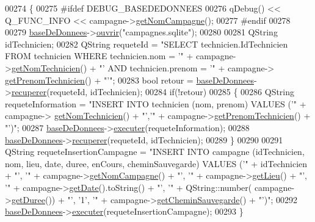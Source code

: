 \begin{DoxyCode}
00274 \{
00275 \textcolor{preprocessor}{    #ifdef DEBUG\_BASEDEDONNEES}
00276     qDebug() << Q\_FUNC\_INFO << campagne->\hyperlink{class_campagne_a99a682fcb8e5a3f8c2aff7a44eb2c930}{getNomCampagne}();
00277 \textcolor{preprocessor}{    #endif}
00278 
00279     \hyperlink{class_i_h_m_accueil_ab56d9846c071396a92f88272880e2c1f}{baseDeDonnees}->\hyperlink{class_base_de_donnees_a7f6a5510b08017b0d99115a84252f186}{ouvrir}(\textcolor{stringliteral}{"campagnes.sqlite"});
00280 
00281     QString idTechnicien;
00282     QString requeteId = \textcolor{stringliteral}{"SELECT technicien.IdTechnicien FROM technicien WHERE technicien.nom = '"} + 
      campagne->\hyperlink{class_campagne_ae1df1bd6234222ccdaf5a1d20d64ee46}{getNomTechnicien}() + \textcolor{stringliteral}{"' AND technicien.prenom = '"} + campagne->
      \hyperlink{class_campagne_ac6c7772ef5d7b15964664d659b486263}{getPrenomTechnicien}() + \textcolor{stringliteral}{"'"};
00283     \textcolor{keywordtype}{bool} retour = \hyperlink{class_i_h_m_accueil_ab56d9846c071396a92f88272880e2c1f}{baseDeDonnees}->\hyperlink{class_base_de_donnees_a77539baad389f5acf754cd2cd452403e}{recuperer}(requeteId, idTechnicien);
00284     \textcolor{keywordflow}{if}(!retour)
00285     \{
00286         QString requeteInformation = \textcolor{stringliteral}{"INSERT INTO technicien (nom, prenom) VALUES ('"} + campagne->
      \hyperlink{class_campagne_ae1df1bd6234222ccdaf5a1d20d64ee46}{getNomTechnicien}() + \textcolor{stringliteral}{"','"} + campagne->\hyperlink{class_campagne_ac6c7772ef5d7b15964664d659b486263}{getPrenomTechnicien}() + \textcolor{stringliteral}{"')"};
00287         \hyperlink{class_i_h_m_accueil_ab56d9846c071396a92f88272880e2c1f}{baseDeDonnees}->\hyperlink{class_base_de_donnees_aa8de5f8f8bb17edc43f5c0ee33712081}{executer}(requeteInformation);
00288         \hyperlink{class_i_h_m_accueil_ab56d9846c071396a92f88272880e2c1f}{baseDeDonnees}->\hyperlink{class_base_de_donnees_a77539baad389f5acf754cd2cd452403e}{recuperer}(requeteId, idTechnicien);
00289     \}
00290 
00291     QString requeteInsertionCampagne = \textcolor{stringliteral}{"INSERT INTO campagne (idTechnicien, nom, lieu, date, duree,
       enCours, cheminSauvegarde) VALUES ('"} + idTechnicien + \textcolor{stringliteral}{"', '"} + campagne->\hyperlink{class_campagne_a99a682fcb8e5a3f8c2aff7a44eb2c930}{getNomCampagne}() + \textcolor{stringliteral}{"', '"} +
       campagne->\hyperlink{class_campagne_a98d71a731d16dec7a882787387b29d8e}{getLieu}() + \textcolor{stringliteral}{"', '"} + campagne->\hyperlink{class_campagne_a319b5bb4ed2b0fc1a10fc4d099a7a6d2}{getDate}().toString() + \textcolor{stringliteral}{"', '"} + QString::number(
      campagne->\hyperlink{class_campagne_abe02a9050f4a5ea9521dd40b855c350b}{getDuree}()) + \textcolor{stringliteral}{"', '1', '"} + campagne->\hyperlink{class_campagne_ad752790357417d83a93056d9c9689a16}{getCheminSauvegarde}() + \textcolor{stringliteral}{"')"};
00292     \hyperlink{class_i_h_m_accueil_ab56d9846c071396a92f88272880e2c1f}{baseDeDonnees}->\hyperlink{class_base_de_donnees_aa8de5f8f8bb17edc43f5c0ee33712081}{executer}(requeteInsertionCampagne);
00293 \}
\end{DoxyCode}
